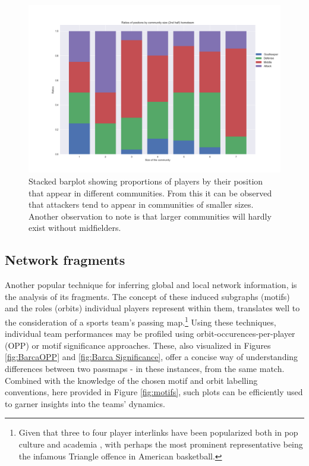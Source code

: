 \documentclass[9pt,twocolumn,twoside]{pnas-report}
\begin{document}
\begin{figure}[t]\centering
	\includegraphics[width=0.8\linewidth]{stack_bar_positions_hht1.png}
	\caption{Stacked barplot showing proportions of players by their position that appear in different communities. From this it can be observed that attackers tend to appear in communities of smaller sizes. Another observation to note is that larger communities will hardly exist without midfielders.}
	\label{fig:stackbar}
\end{figure}




\subsection*{Network fragments}
Another popular technique for inferring global and local network information, is the analysis of its fragments. The concept of these induced subgraphs (motifs) and the roles (orbits) individual players represent within them, translates well to the consideration of a sports team's passing map.\footnote{Given that three to four player interlinks have been popularized both in pop culture and academia \cite{triangle}, with perhaps the most prominent representative being the infamous Triangle offence in American basketball.}  Using these techniques, individual team performances may be profiled using orbit-occurences-per-player (OPP) or motif significance approaches. These, also visualized in Figures \ref{fig:BarcaOPP} and \ref{fig:Barca Significance}, offer a concise way of understanding differences between two passmaps - in these instances, from the same match. Combined with the knowledge of the chosen motif and orbit labelling conventions, here provided in Figure \ref{fig:motifs}, such plots can be efficiently used to garner insights into the teams' dynamics. 
\end{document}
